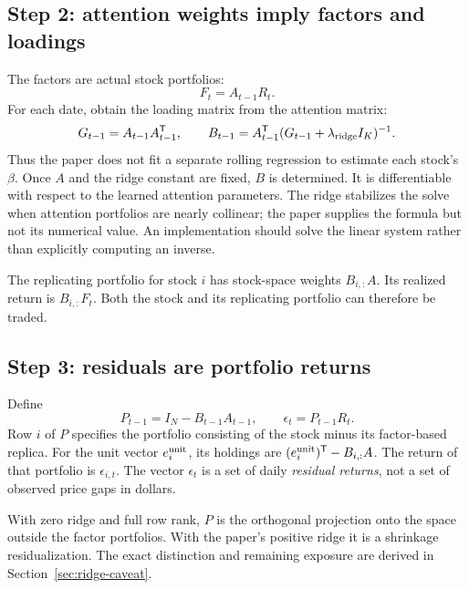 \documentclass[11pt]{article}
\begin{document}
\subsection{Step 2: attention weights imply factors and loadings}
\label{sec:factors-loadings}

The factors are actual stock portfolios:
\begin{equation}
 F_t=A_{t-1}R_t.
 \label{eq:factors}
\end{equation}
For each date, obtain the loading matrix from the attention matrix:
\begin{equation}
 G_{t-1}=A_{t-1}A_{t-1}^{\mathsf T},\qquad
 B_{t-1}=A_{t-1}^{\mathsf T}
 (G_{t-1}+\lambda_{\rm ridge}I_K)^{-1}.
 \label{eq:loadings}
\end{equation}
Thus the paper does not fit a separate rolling regression to estimate
each stock's $\beta$. Once $A$ and the ridge constant are fixed, $B$ is
determined. It is differentiable with respect to the learned attention
parameters. The ridge stabilizes the solve when attention portfolios are
nearly collinear; the paper supplies the formula but not its numerical
value. An implementation should solve the linear system rather than
explicitly computing an inverse.

The replicating portfolio for stock $i$ has stock-space weights
$B_{i,:}A$. Its realized return is $B_{i,:}F_t$. Both the stock and
its replicating portfolio can therefore be traded.

\subsection{Step 3: residuals are portfolio returns}
\label{sec:residual-portfolios}

Define
\begin{equation}
 P_{t-1}=I_N-B_{t-1}A_{t-1},\qquad
 \epsilon_t=P_{t-1}R_t.
 \label{eq:residual-portfolios}
\end{equation}
Row $i$ of $P$ specifies the portfolio consisting of the stock minus
its factor-based replica. For the unit vector $e_i^{\rm unit}$,
its holdings are $(e_i^{\rm unit})^{\mathsf T}-B_{i,:}A$.
The return of that portfolio is $\epsilon_{i,t}$. The vector
$\epsilon_t$ is a set of daily \emph{residual returns}, not a set of
observed price gaps in dollars.

With zero ridge and full row rank, $P$ is the orthogonal projection
onto the space outside the factor portfolios. With the paper's positive
ridge it is a shrinkage residualization. The exact distinction and
remaining exposure are derived in Section~\ref{sec:ridge-caveat}.
\end{document}
